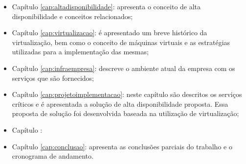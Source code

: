 \begin{itemize}
 \item Capítulo \ref{cap:altadisponibilidade}: apresenta o conceito de alta disponibilidade e conceitos relacionados;
 \item Capítulo \ref{cap:virtualizacao}: é apresentado um breve histórico da virtualização, bem como o conceito de máquinas virtuais e as 
 estratégias utilizadas para a implementação das mesmas;
 \item Capítulo \ref{cap:infraempresa}: descreve o ambiente atual da empresa com os serviços que são fornecidos;
 \item Capítulo \ref{cap:projetoimplementacao}: neste capítulo são descritos os serviços críticos e é apresentada a solução de alta disponibilidade 
 proposta. Essa proposta de solução foi desenvolvida baseada na utilização de virtualização;
 \item Capítulo :
 \item Capítulo \ref{cap:conclusao}: apresenta as conclusões parciais do trabalho e o cronograma de andamento.
\end{itemize}
